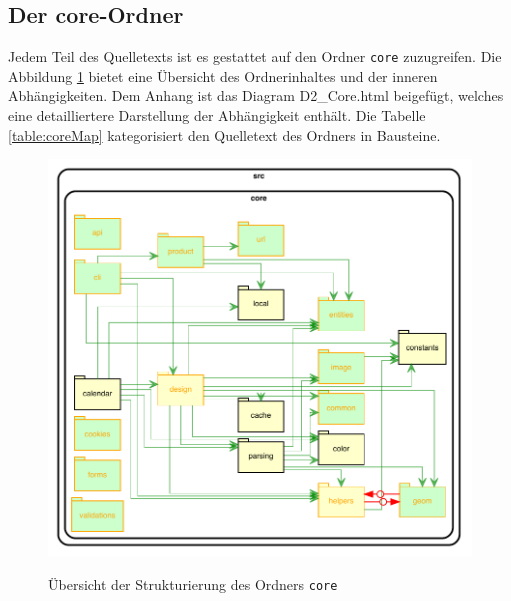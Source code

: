 \subsection{Der core-Ordner}

Jedem Teil des Quelletexts ist es gestattet auf den Ordner \lstinline|core| zuzugreifen.
Die Abbildung \ref{fig:core-sturktur} bietet eine Übersicht des Ordnerinhaltes und der inneren Abhängigkeiten.
Dem Anhang ist das Diagram D2\_Core.html beigefügt, welches eine detailliertere Darstellung der Abhängigkeit enthält.
Die Tabelle \ref{table:coreMap} kategorisiert den Quelletext des Ordners in Bausteine.

\begin{figure}[H]
    \centering
    \caption{Übersicht der Strukturierung des Ordners \lstinline|core|}
    \includegraphics[width=\textwidth]{diagrams/Ist-Architektur/core-graph.pdf}
    \label{fig:core-sturktur}
\end{figure}

